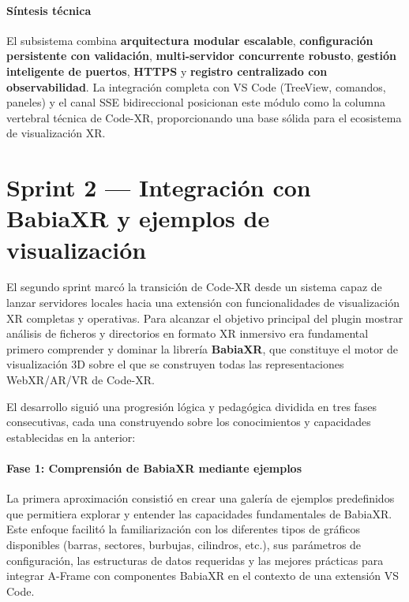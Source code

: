 \documentclass[a4paper, 12pt]{book}
\begin{document}
\paragraph{Síntesis técnica}
El subsistema combina \textbf{arquitectura modular escalable}, \textbf{configuración persistente con validación}, \textbf{multi-servidor concurrente robusto}, \textbf{gestión inteligente de puertos}, \textbf{HTTPS} y \textbf{registro centralizado con observabilidad}. La integración completa con VS Code (TreeView, comandos, paneles) y el canal SSE bidireccional posicionan este módulo como la columna vertebral técnica de Code-XR, proporcionando una base sólida para el ecosistema de visualización XR.


\section{Sprint 2 — Integración con BabiaXR y ejemplos de visualización}
\label{sec:sprint-babiaxr}

El segundo sprint marcó la transición de Code-XR desde un sistema capaz de lanzar servidores locales hacia una extensión con funcionalidades de visualización XR completas y operativas. Para alcanzar el objetivo principal del plugin mostrar análisis de ficheros y directorios en formato XR inmersivo era fundamental primero comprender y dominar la librería \textbf{BabiaXR}, que constituye el motor de visualización 3D sobre el que se construyen todas las representaciones WebXR/AR/VR de Code-XR.

El desarrollo siguió una progresión lógica y pedagógica dividida en tres fases consecutivas, cada una construyendo sobre los conocimientos y capacidades establecidas en la anterior:

\paragraph{Fase 1: Comprensión de BabiaXR mediante ejemplos}
La primera aproximación consistió en crear una galería de ejemplos predefinidos que permitiera explorar y entender las capacidades fundamentales de BabiaXR. Este enfoque facilitó la familiarización con los diferentes tipos de gráficos disponibles (barras, sectores, burbujas, cilindros, etc.), sus parámetros de configuración, las estructuras de datos requeridas y las mejores prácticas para integrar A-Frame con componentes BabiaXR en el contexto de una extensión VS Code.
\end{document}
